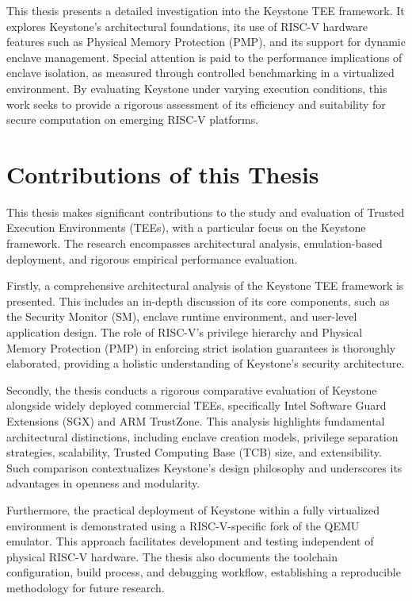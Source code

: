 This thesis presents a detailed investigation into the Keystone TEE framework. It explores Keystone's architectural foundations, its use of RISC-V hardware features such as Physical Memory Protection (PMP), and its support for dynamic enclave management. Special attention is paid to the performance implications of enclave isolation, as measured through controlled benchmarking in a virtualized environment. By evaluating Keystone under varying execution conditions, this work seeks to provide a rigorous assessment of its efficiency and suitability for secure computation on emerging RISC-V platforms.


\section{Contributions of this Thesis}

This thesis makes significant contributions to the study and evaluation of Trusted Execution Environments (TEEs), with a particular focus on the Keystone framework. The research encompasses architectural analysis, emulation-based deployment, and rigorous empirical performance evaluation.

Firstly, a comprehensive architectural analysis of the Keystone TEE framework is presented. This includes an in-depth discussion of its core components, such as the Security Monitor (SM), enclave runtime environment, and user-level application design. The role of RISC-V’s privilege hierarchy and Physical Memory Protection (PMP) in enforcing strict isolation guarantees is thoroughly elaborated, providing a holistic understanding of Keystone’s security architecture.

Secondly, the thesis conducts a rigorous comparative evaluation of Keystone alongside widely deployed commercial TEEs, specifically Intel Software Guard Extensions (SGX) and ARM TrustZone. This analysis highlights fundamental architectural distinctions, including enclave creation models, privilege separation strategies, scalability, Trusted Computing Base (TCB) size, and extensibility. Such comparison contextualizes Keystone’s design philosophy and underscores its advantages in openness and modularity.

Furthermore, the practical deployment of Keystone within a fully virtualized environment is demonstrated using a RISC-V-specific fork of the QEMU emulator. This approach facilitates development and testing independent of physical RISC-V hardware. The thesis also documents the toolchain configuration, build process, and debugging workflow, establishing a reproducible methodology for future research.

